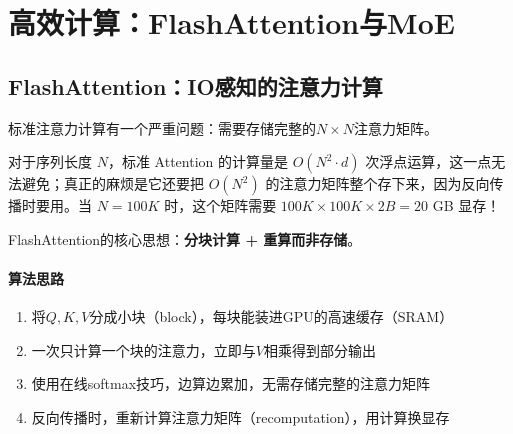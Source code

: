 \section*{高效计算：FlashAttention与MoE}


\subsection*{FlashAttention：IO感知的注意力计算}


标准注意力计算有一个严重问题：需要存储完整的$N \times N$注意力矩阵。

\begin{keyformula}[title=标准Attention的显存瓶颈]
对于序列长度 $N$，标准 Attention 的计算量是 $O(N^2 \cdot d)$ 次浮点运算，这一点无法避免；真正的麻烦是它还要把 $O(N^2)$ 的注意力矩阵整个存下来，因为反向传播时要用。当 $N = 100K$ 时，这个矩阵需要 $100K \times 100K \times 2B = 20$ GB 显存！
\end{keyformula}

FlashAttention的核心思想：\textbf{分块计算 + 重算而非存储}。

\paragraph{算法思路}

\begin{enumerate}
    \item 将$Q, K, V$分成小块（block），每块能装进GPU的高速缓存（SRAM）
    \item 一次只计算一个块的注意力，立即与$V$相乘得到部分输出
    \item 使用在线softmax技巧，边算边累加，无需存储完整的注意力矩阵
    \item 反向传播时，重新计算注意力矩阵（recomputation），用计算换显存
\end{enumerate}

